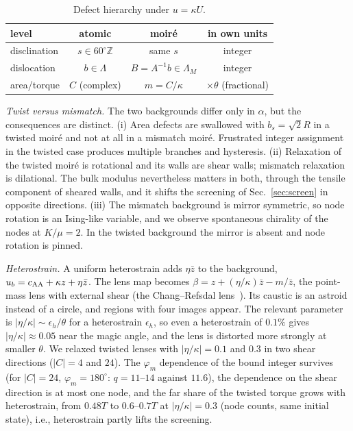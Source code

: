 \documentclass[prb,twocolumn,superscriptaddress,floatfix,10pt]{revtex4-2}
\begin{document}
\begin{table}[t]
\caption{Defect hierarchy under $u=\kappa U$.}
\label{tab:hier}
\begin{ruledtabular}\small
\begin{tabular}{lccc}
level & atomic & moir\'e & in own units\\
\hline
disclination & $s\in60^\circ\mathbb{Z}$ & same $s$ & integer\\
dislocation & $b\in\Lambda$ & $B=A^{-1}b\in\Lambda_M$ & integer\\
area/torque & $C$ (complex) & $m=C/\kappa$ & $\times\theta$ (fractional)\\
\end{tabular}
\end{ruledtabular}
\end{table}

\emph{Twist versus mismatch.} The two backgrounds differ only in $\alpha$, but the consequences are distinct. (i) Area defects are swallowed with $b_s=\sqrt2R$ in a twisted moir\'e and not at all in a mismatch moir\'e. Frustrated integer assignment in the twisted case produces multiple branches and hysteresis. (ii) Relaxation of the twisted moir\'e is rotational and its walls are shear walls; mismatch relaxation is dilational. The bulk modulus nevertheless matters in both, through the tensile component of sheared walls, and it shifts the screening of Sec.~\ref{sec:screen} in opposite directions. (iii) The mismatch background is mirror symmetric, so node rotation is an Ising-like variable, and we observe spontaneous chirality of the nodes at $K/\mu=2$. In the twisted background the mirror is absent and node rotation is pinned.

\emph{Heterostrain.} A uniform heterostrain adds $\eta\bar z$ to the background, $u_b=c_{\rm AA}+\kappa z+\eta\bar z$. The lens map becomes $\beta=z+(\eta/\kappa)\bar z-m/\bar z$, the point-mass lens with external shear (the Chang--Refsdal lens~\cite{ChangRefsdal1979}). Its caustic is an astroid instead of a circle, and regions with four images appear. The relevant parameter is $|\eta/\kappa|\sim\epsilon_h/\theta$ for a heterostrain $\epsilon_h$, so even a heterostrain of $0.1\%$ gives $|\eta/\kappa|\approx0.05$ near the magic angle, and the lens is distorted more strongly at smaller $\theta$. We relaxed twisted lenses with $|\eta/\kappa|=0.1$ and $0.3$ in two shear directions ($|C|=4$ and $24$). The $\varphi_m$ dependence of the bound integer survives (for $|C|=24$, $\varphi_m=180^\circ$: $q=11$--$14$ against $11.6$), the dependence on the shear direction is at most one node, and the far share of the twisted torque grows with heterostrain, from $0.48T$ to $0.6$--$0.7T$ at $|\eta/\kappa|=0.3$ (node counts, same initial state), i.e., heterostrain partly lifts the screening.
\end{document}
